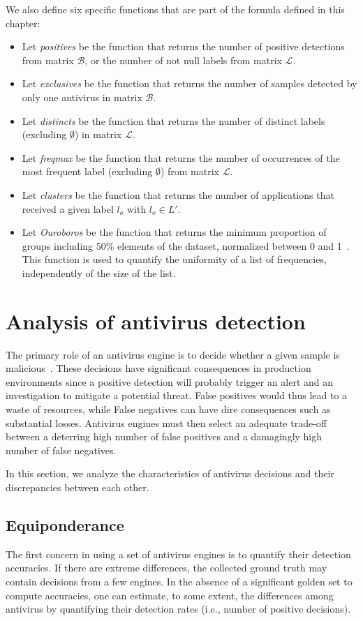 We also define six specific functions that are part of the formula defined in this chapter:

\begin{itemize}
	\item Let \textit{positives} be the function that returns the number of positive detections from matrix $\mathcal{B}$, or the number of not null labels from matrix $\mathcal{L}$.
	\item Let \textit{exclusives} be the function that returns the number of samples detected by only one antivirus in matrix $\mathcal{B}$.
	\item Let \textit{distincts} be the function that returns the number of distinct labels (excluding $\emptyset$) in matrix $\mathcal{L}$.
	\item Let \textit{freqmax} be the function that returns the number of occurrences of the most frequent label (excluding $\emptyset$) from matrix $\mathcal{L}$.
	\item Let \textit{clusters} be the function that returns the number of applications that received a given label $l_o$ with $l_o \in L'$.
	\item Let \textit{Ouroboros} be the function that returns the minimum proportion of groups including 50\% elements of the dataset, normalized between 0 and 1~\cite{hurier_definition_nodate}. This function is used to quantify the uniformity of a list of frequencies, independently of the size of the list.
\end{itemize}

\section{Analysis of antivirus detection}
The primary role of an antivirus engine is to decide whether a given sample is malicious~\cite{bureau_dose_2008}.
These decisions have significant consequences in production environments since a positive detection will probably trigger an alert and an investigation to mitigate a potential threat.
False positives would thus lead to a waste of resources, while False negatives can have dire consequences such as substantial losses.
Antivirus engines must then select an adequate trade-off between a deterring high number of false positives and a damagingly high number of false negatives.

In this section, we analyze the characteristics of antivirus decisions and their discrepancies between each other.
\subsection{Equiponderance}
The first concern in using a set of antivirus engines is to quantify their detection accuracies.
If there are extreme differences, the collected ground truth may contain decisions from a few engines.
In the absence of a significant golden set to compute accuracies, one can estimate, to some extent, the differences among antivirus by quantifying their detection rates (i.e., number of positive decisions).


